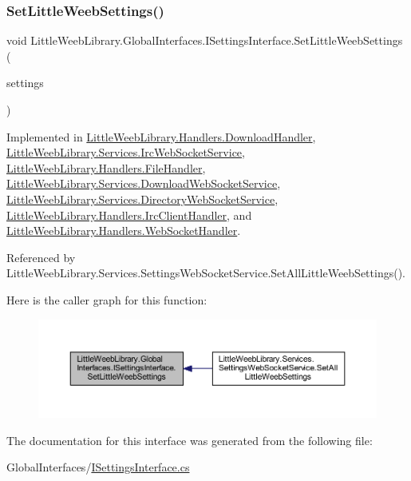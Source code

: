 \subsubsection{\texorpdfstring{Set\+Little\+Weeb\+Settings()}{SetLittleWeebSettings()}}
{\footnotesize\ttfamily void Little\+Weeb\+Library.\+Global\+Interfaces.\+I\+Settings\+Interface.\+Set\+Little\+Weeb\+Settings (\begin{DoxyParamCaption}\item[{\mbox{\hyperlink{class_little_weeb_library_1_1_settings_1_1_little_weeb_settings}{Little\+Weeb\+Settings}}}]{settings }\end{DoxyParamCaption})}



Implemented in \mbox{\hyperlink{class_little_weeb_library_1_1_handlers_1_1_download_handler_a0ad546188f5b5145dd9b088852cd29f8}{Little\+Weeb\+Library.\+Handlers.\+Download\+Handler}}, \mbox{\hyperlink{class_little_weeb_library_1_1_services_1_1_irc_web_socket_service_a48697b5d89c2899e73d1ecf7492bd083}{Little\+Weeb\+Library.\+Services.\+Irc\+Web\+Socket\+Service}}, \mbox{\hyperlink{class_little_weeb_library_1_1_handlers_1_1_file_handler_a81ebb3e28e77c5fc30acaf7d769ba8df}{Little\+Weeb\+Library.\+Handlers.\+File\+Handler}}, \mbox{\hyperlink{class_little_weeb_library_1_1_services_1_1_download_web_socket_service_a4b1d1eda437419a534bb4ee17ed26d4f}{Little\+Weeb\+Library.\+Services.\+Download\+Web\+Socket\+Service}}, \mbox{\hyperlink{class_little_weeb_library_1_1_services_1_1_directory_web_socket_service_a015a3ae2bb0f275de152ae039fad566e}{Little\+Weeb\+Library.\+Services.\+Directory\+Web\+Socket\+Service}}, \mbox{\hyperlink{class_little_weeb_library_1_1_handlers_1_1_irc_client_handler_ae0b7e9fc2b6c7874a6be2a938f88fc1a}{Little\+Weeb\+Library.\+Handlers.\+Irc\+Client\+Handler}}, and \mbox{\hyperlink{class_little_weeb_library_1_1_handlers_1_1_web_socket_handler_a7ca1faf86f9796afd4c9981a7c961f3b}{Little\+Weeb\+Library.\+Handlers.\+Web\+Socket\+Handler}}.



Referenced by Little\+Weeb\+Library.\+Services.\+Settings\+Web\+Socket\+Service.\+Set\+All\+Little\+Weeb\+Settings().

Here is the caller graph for this function\+:\nopagebreak
\begin{figure}[H]
\begin{center}
\leavevmode
\includegraphics[width=350pt]{interface_little_weeb_library_1_1_global_interfaces_1_1_i_settings_interface_a5c53e44105f1f4c7f8c3e546d29939d7_icgraph}
\end{center}
\end{figure}


The documentation for this interface was generated from the following file\+:\begin{DoxyCompactItemize}
\item 
Global\+Interfaces/\mbox{\hyperlink{_i_settings_interface_8cs}{I\+Settings\+Interface.\+cs}}\end{DoxyCompactItemize}
